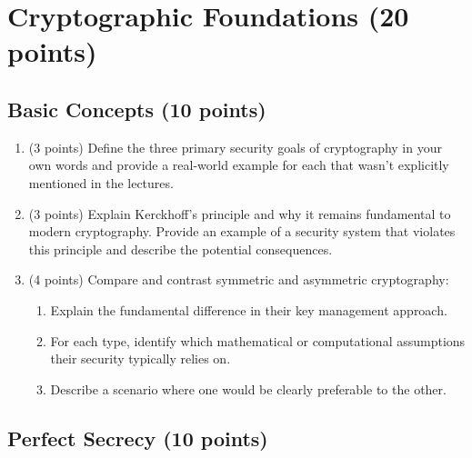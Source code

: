\documentclass[10pt,a4paper,american]{article}
\begin{document}
\section{Cryptographic Foundations (20 points)}

\subsection{Basic Concepts (10 points)}

\begin{enumerate}
	\item (3 points) Define the three primary security goals of cryptography in your own words and provide a real-world example for each that wasn't explicitly mentioned in the lectures.

	\item (3 points) Explain Kerckhoff's principle and why it remains fundamental to modern cryptography. Provide an example of a security system that violates this principle and describe the potential consequences.

	\item (4 points) Compare and contrast symmetric and asymmetric cryptography:
	      \begin{enumerate}
		      \item Explain the fundamental difference in their key management approach.
		      \item For each type, identify which mathematical or computational assumptions their security typically relies on.
		      \item Describe a scenario where one would be clearly preferable to the other.
	      \end{enumerate}
\end{enumerate}

\subsection{Perfect Secrecy (10 points)}
\end{document}

